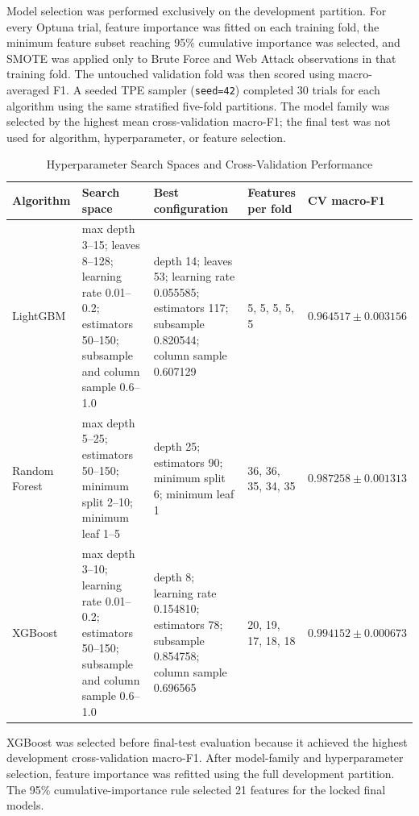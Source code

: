 Model selection was performed exclusively on the development partition.
For every Optuna trial, feature importance was fitted on each training
fold, the minimum feature subset reaching 95\% cumulative importance was
selected, and SMOTE was applied only to Brute Force and Web Attack
observations in that training fold. The untouched validation fold was
then scored using macro-averaged F1. A seeded TPE sampler
(\texttt{seed=42}) completed 30 trials for each algorithm using the same
stratified five-fold partitions. The model family was selected by the
highest mean cross-validation macro-F1; the final test was not used for
algorithm, hyperparameter, or feature selection.

\begin{table}[H]
  \caption{Hyperparameter Search Spaces and Cross-Validation Performance}
  \centering
  \scriptsize
  \begin{tabularx}{\textwidth}{|p{1.8cm}|X|X|p{1.8cm}|p{1.8cm}|}
    \hline
    \textbf{Algorithm} & \textbf{Search space} & \textbf{Best configuration} & \textbf{Features per fold} & \textbf{CV macro-F1} \\ \hline
    LightGBM & max depth 3--15; leaves 8--128; learning rate 0.01--0.2; estimators 50--150; subsample and column sample 0.6--1.0 & depth 14; leaves 53; learning rate 0.055585; estimators 117; subsample 0.820544; column sample 0.607129 & 5, 5, 5, 5, 5 & $0.964517 \pm 0.003156$ \\ \hline
    Random Forest & max depth 5--25; estimators 50--150; minimum split 2--10; minimum leaf 1--5 & depth 25; estimators 90; minimum split 6; minimum leaf 1 & 36, 36, 35, 34, 35 & $0.987258 \pm 0.001313$ \\ \hline
    XGBoost & max depth 3--10; learning rate 0.01--0.2; estimators 50--150; subsample and column sample 0.6--1.0 & depth 8; learning rate 0.154810; estimators 78; subsample 0.854758; column sample 0.696565 & 20, 19, 17, 18, 18 & $\mathbf{0.994152 \pm 0.000673}$ \\ \hline
  \end{tabularx}
\end{table}

XGBoost was selected before final-test evaluation because it achieved the
highest development cross-validation macro-F1. After model-family and
hyperparameter selection, feature importance was refitted using the full
development partition. The 95\% cumulative-importance rule selected 21
features for the locked final models.

